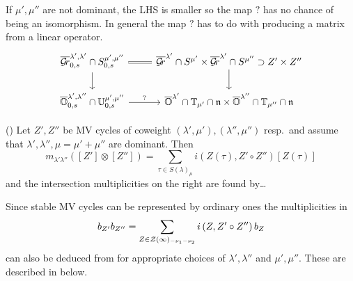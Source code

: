 \documentclass[draft]{article}
\begin{document}
\begin{question}
    If $\mu',\mu''$ are not dominant, the LHS is smaller so the map $?$ has no chance of being an isomorphism. In general the map $?$ has to do with producing a matrix from a linear operator. 
    \[
    \begin{tikzcd}
        \overline\Gr^{\lambda',\lambda'}_{0,s}\cap S^{\mu',\mu''}_{0,s} \ar[r,equals]\ar[d] & \overline\Gr^{\lambda'} \cap S^{\mu'} \times \overline\Gr^{\lambda'} \cap S^{\mu''} \supset Z' \times Z'' \ar[d]\\
        \overline\OO^{\lambda',\lambda''}_{0,s} \cap \UU^{\mu',\mu''}_{0,s} \ar[r,"?"] & \overline\OO^{\lambda'}\cap \TT_{\mu'}\cap \n \times \overline\OO^{\lambda''}\cap \TT_{\mu''}\cap \n
    \end{tikzcd}    
    \]
\end{question}
% 
\begin{proposition}(\cite{baumann2019mirkovic})
    Let $Z',Z''$  be MV cycles of coweight $(\lambda',\mu'),(\lambda'',\mu'')$ resp.\ and assume that $\lambda',\lambda'',\mu = \mu' + \mu''$ are dominant. 
    Then 
    \begin{equation}
        \label{eq:tabmult}
        m_{\lambda'\lambda''} ([Z']\otimes[Z'']) 
        = 
        \sum_{\tau\in S(\lambda)_\mu}
        i\left(
            Z(\tau), Z'\circ Z''
        \right) [Z(\tau)]
    \end{equation}
    and the intersection multiplicities on the right are found by\dots{} 
    

    Since stable MV cycles can be represented by ordinary ones the multiplicities in 
    $$
    b_{Z'}b_{Z''} = \sum_{Z\in\mathcal Z(\infty)_{-\nu_1 - \nu_2}} i \left(
        Z, Z' \circ Z''
    \right) b_Z 
    $$
    can also be deduced from  for appropriate choices of $\lambda',\lambda''$ and $\mu',\mu''$. These are described in  below.
\end{proposition}
\end{document}
